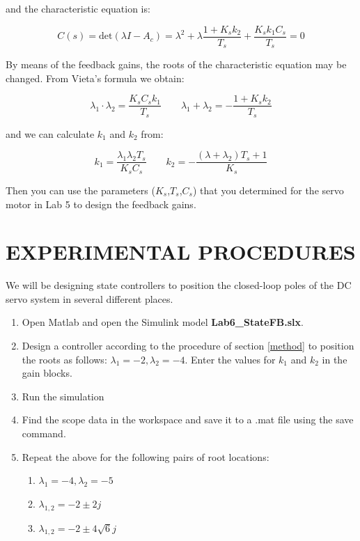 \documentclass[11pt,a4paper]{article}
\begin{document}
and the characteristic equation is:

\begin{equation}
C(s) = \mathrm{det}(\lambda I - A_{c}) = \lambda^{2} + \lambda \frac{1 + K_{s}k_{2}}{T_{s}}+\frac{K_{s}k_{1}C_{s}}{T_{s}} = 0
\end{equation}

By means of the feedback gains, the roots of the characteristic equation may be changed. From Vieta's formula we obtain:

\begin{equation}
\lambda_{1}\cdot\lambda_{2} = \frac{K_{s}C_{s}k_{1}}{T_{s}}    \qquad   \lambda_{1} + \lambda_{2} = -\frac{1+K_{s}k_{2}}{T_{s}}
\end{equation}

and we can calculate $k_{1}$ and $k_{2}$ from:

\begin{equation}
k_{1} = \frac{\lambda_{1}\lambda_{2}T_{s}}{K_{s}C_{s}} \qquad k_{2} = -\frac{(\lambda+\lambda_{2})T_{s}+1}{K_{s}}
\end{equation}

Then you can use the parameters ($K_{s}$,$T_{s}$,$C_{s}$) that you determined for the servo motor in Lab 5 to design the feedback gains.

\section{EXPERIMENTAL PROCEDURES}
We will be designing state controllers to position the closed-loop poles of the DC servo system in several different places.

\begin{enumerate}
\item Open Matlab and open the Simulink model \textbf{Lab6\_StateFB.slx}.
\item Design a controller according to the procedure of section \ref{method} to position the roots as follows: $\lambda_{1}=-2, \lambda_{2}=-4$. Enter the values for $k_{1}$ and $k_{2}$ in the gain blocks.
\item Run the simulation
\item Find the scope data in the workspace and save it to a .mat file using the save command.
\item Repeat the above for the following pairs of root locations:
\begin{enumerate}
\item $\lambda_{1}=-4, \lambda_{2}=-5$
\item $\lambda_{1,2} = -2 \pm 2j$
\item $\lambda_{1,2} = -2 \pm 4\sqrt{6}j$
\end{enumerate}

\end{enumerate}
\end{document}
